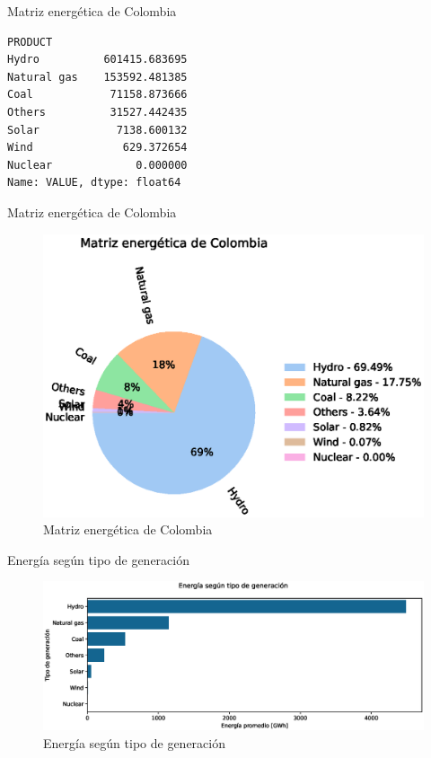 \documentclass[10pt]{beamer}
\begin{document}
\begin{frame}[fragile]{Matriz energética de Colombia}
\begin{verbatim}
PRODUCT
Hydro          601415.683695
Natural gas    153592.481385
Coal            71158.873666
Others          31527.442435
Solar            7138.600132
Wind              629.372654
Nuclear             0.000000
Name: VALUE, dtype: float64
\end{verbatim}
\end{frame}

\begin{frame}[fragile]{Matriz energética de Colombia}
\begin{figure}[t]
	\centering
	\includegraphics[width=1.2\linewidth]{../../reports/fig_6}
	\caption{Matriz energética de Colombia}
	\label{fig:fig6}
\end{figure}	
\end{frame}


\begin{frame}[fragile]{Energía según tipo de generación}
\begin{figure}[t]
	\centering
	\includegraphics[width=0.9\linewidth]{../../reports/fig_7}
	\caption{Energía según tipo de generación}
	\label{fig:fig7}
\end{figure}	
\end{frame}
\end{document}
